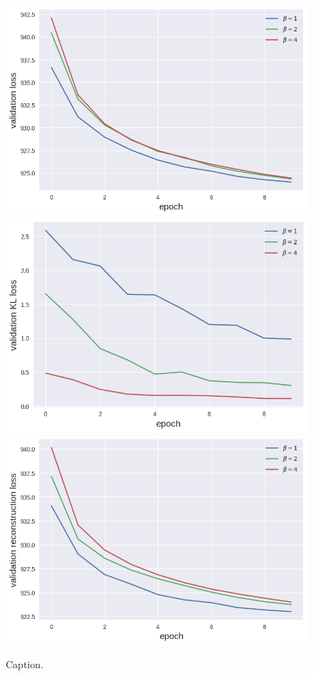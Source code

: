 \begin{figure}[h!]
\centering
\captionsetup{justification=centering}
    \includegraphics[scale=0.5]{figures/results/weighted_average/val_loss.png}
    \includegraphics[scale=0.5]{figures/results/weighted_average/val_kl_loss.png}
    \includegraphics[scale=0.5]{figures/results/weighted_average/val_reconstruction_loss.png}
\caption{Caption.}
\label{fig:weighted_average_graphs}
\end{figure}




